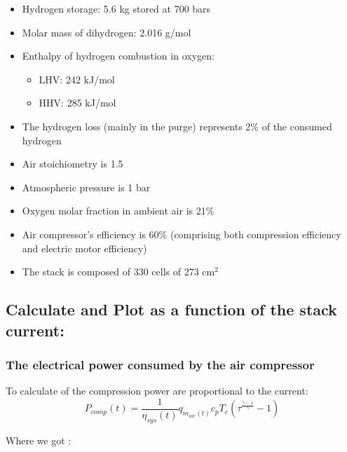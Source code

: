 \documentclass[12pt,a4paper]{article}
\numberwithin{equation}{section}
\begin{document}
{\begin{itemize}
	\item Hydrogen storage: 5.6 kg stored at 700 bars
	\item Molar mass of dihydrogen: 2.016 g/mol
	\item Enthalpy of hydrogen combustion in oxygen:
	\begin{itemize}
		\item LHV: 242 kJ/mol
		\item HHV: 285 kJ/mol
	\end{itemize}
	\item The hydrogen loss (mainly in the purge) represents 2\% of the consumed hydrogen
	\item Air stoichiometry is 1.5
	\item Atmospheric pressure is 1 bar
	\item Oxygen molar fraction in ambient air is 21\%
\end{itemize}

\begin{itemize}
	\item Air compressor's efficiency is 60\% (comprising both compression efficiency and electric motor efficiency)
	\item The stack is composed of 330 cells of 273 cm\(^2\)

\end{itemize}


\subsection{Calculate and Plot as a function of the stack current: }
\subsubsection{The electrical power consumed by the air compressor}

To calculate of the compression power are proportional to the current:
\begin{equation}
	P_{comp}(t) = \frac{1}{\eta_{sys}(t)}q_{m_{air}(t)}c_pT_e(\tau^{\frac{\gamma-1}{\gamma}}-1)\label{eq2.1}
\end{equation}

Where we got :

}
\end{document}
